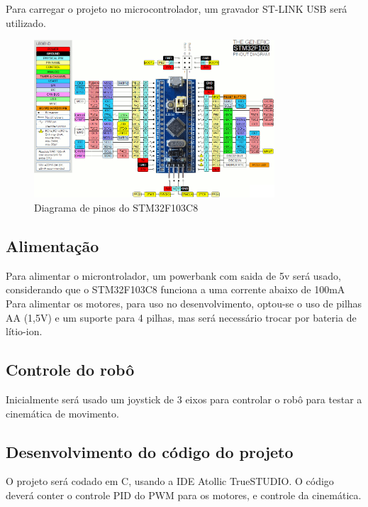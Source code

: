 Para carregar o projeto no microcontrolador, um gravador ST-LINK USB será utilizado.

\begin{figure}[h]
	\centering
	\includegraphics[width=0.8\textwidth]{figures/stm32f1_pinout}
	\caption{Diagrama de pinos do STM32F103C8}
\end{figure}

\subsection{Alimentação}
Para alimentar o microntrolador, um powerbank com saida de 5v será usado, considerando que o STM32F103C8 funciona a uma corrente abaixo de 100mA
Para alimentar os motores, para uso no desenvolvimento, optou-se o uso de pilhas AA (1,5V) e um suporte para 4 pilhas, 
mas será necessário trocar por bateria de lítio-ion.

\subsection{Controle do robô}
Inicialmente será usado um joystick de 3 eixos para controlar o robô para testar a cinemática de movimento.

\subsection{Desenvolvimento do código do projeto}
O projeto será codado em C, usando a IDE Atollic TrueSTUDIO.
O código deverá conter o controle PID do PWM para os motores, e controle da cinemática.
